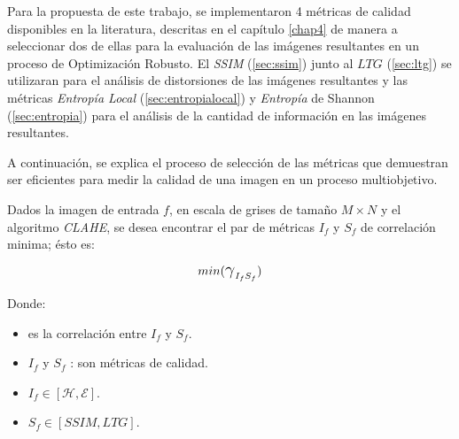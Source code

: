 Para la propuesta de este trabajo, se implementaron 4 métricas de calidad disponibles en la literatura, descritas en el capítulo \ref{chap4} de manera a seleccionar dos de ellas para la evaluación de las imágenes resultantes en un proceso de Optimización Robusto. El \textit{SSIM} (\ref{sec:ssim}) junto al $LTG$ (\ref{sec:ltg}) se utilizaran para el análisis de distorsiones de las imágenes resultantes y las métricas \textit{Entropía Local} (\ref{sec:entropialocal}) y \textit{Entropía} de Shannon (\ref{sec:entropia}) para el análisis de la cantidad de información en las imágenes resultantes.


A continuación, se explica el proceso de selección de las métricas que demuestran ser eficientes para medir la calidad de una imagen en un proceso multiobjetivo. 



Dados la imagen de entrada $f$, en escala de grises de tamaño $M \times N$ y el algoritmo \textit{CLAHE}, se desea encontrar el par de métricas $I_f$ y $S_f$ de correlación minima; ésto es:

\begin{equation}\label{eq:fitness}
 min (\text{\Large{$\gamma$}}_{{I_f}{S_f}})
\end{equation}

Donde:
\begin{itemize}
\item \text{\Large{$\gamma$}} es la correlación entre ${I_f}$ y ${S_f}$.
\item ${I_f}$ y ${S_f}$ : son métricas de calidad.
\item $ I_f \in [\mathscr{H}, \mathscr{E}]$. 
\item $ S_f \in [{SSIM}, {LTG}]$.
\end{itemize}

